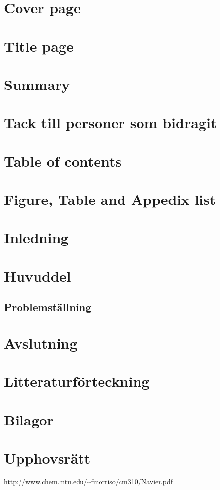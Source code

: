 \documentclass{article}
\begin{document}
\section{Cover page}
\section{Title page}

\section{Summary}
\section{Tack till personer som bidragit}
\section{Table of contents}
\section{Figure, Table and Appedix list}

\section{Inledning}
\section{Huvuddel}
\subsection{Problemställning}
\section{Avslutning}

\section{Litteraturförteckning}
\section{Bilagor}
\section{Upphovsrätt}

\begin{thebibliography}{10}

\url{http://www.chem.mtu.edu/~fmorriso/cm310/Navier.pdf}

\end{thebibliography}
\end{document}

